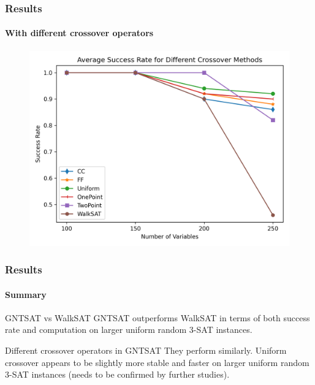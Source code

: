 \begin{frame}
\frametitle{Results}
\framesubtitle{With different crossover operators}
\begin{figure}[htpb]
	\centering
	\includegraphics[scale=0.13]{AverageSR.png}
\end{figure}
\end{frame}

\begin{frame}
\frametitle{Results}
\framesubtitle{Summary}
\begin{alertblock}{GNTSAT vs WalkSAT}
	GNTSAT outperforms WalkSAT in terms of both success
	rate and computation on larger uniform random 3-SAT instances.
\end{alertblock}

\begin{alertblock}{Different crossover operators in GNTSAT}
	They perform similarly. Uniform crossover appears to
	be slightly more stable and faster on larger uniform random 3-SAT instances
	(needs to be confirmed by further studies).
\end{alertblock}

\end{frame}
